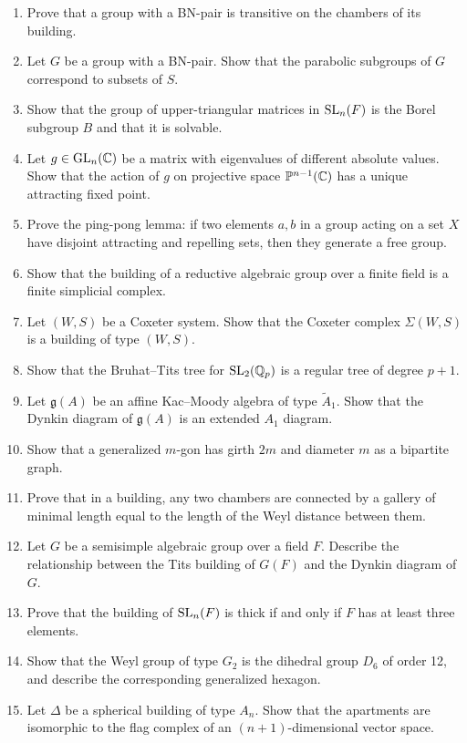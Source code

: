 \begin{enumerate}
    \item [I] Prove that a group with a BN-pair is transitive on the chambers of its building.
    \item [I] Let \(G\) be a group with a BN-pair. Show that the parabolic subgroups of \(G\) correspond to subsets of \(S\).
    \item [B] Show that the group of upper-triangular matrices in \(\operatorname{SL}_n(F)\) is the Borel subgroup \(B\) and that it is solvable.
    \item [I] Let \(g \in \operatorname{GL}_n(\mathbb{C})\) be a matrix with eigenvalues of different absolute values. Show that the action of \(g\) on projective space \(\mathbb{P}^{n-1}(\mathbb{C})\) has a unique attracting fixed point.
    \item [I] Prove the ping-pong lemma: if two elements \(a, b\) in a group acting on a set \(X\) have disjoint attracting and repelling sets, then they generate a free group.
    \item [I] Show that the building of a reductive algebraic group over a finite field is a finite simplicial complex.
    \item [I] Let \((W, S)\) be a Coxeter system. Show that the Coxeter complex \(\Sigma(W, S)\) is a building of type \((W, S)\).
    \item [I] Show that the Bruhat--Tits tree for \(\operatorname{SL}_2(\mathbb{Q}_p)\) is a regular tree of degree \(p+1\).
    \item [I] Let \(\mathfrak{g}(A)\) be an affine Kac--Moody algebra of type \(\tilde{A}_1\). Show that the Dynkin diagram of \(\mathfrak{g}(A)\) is an extended \(A_1\) diagram.
    \item [B] Show that a generalized \(m\)-gon has girth \(2m\) and diameter \(m\) as a bipartite graph.
    \item [I] Prove that in a building, any two chambers are connected by a gallery of minimal length equal to the length of the Weyl distance between them.
    \item [I] Let \(G\) be a semisimple algebraic group over a field \(F\). Describe the relationship between the Tits building of \(G(F)\) and the Dynkin diagram of \(G\).
    \item [B] Prove that the building of \(\operatorname{SL}_n(F)\) is thick if and only if \(F\) has at least three elements.
    \item [I] Show that the Weyl group of type \(G_2\) is the dihedral group \(D_6\) of order 12, and describe the corresponding generalized hexagon.
    \item [I] Let \(\Delta\) be a spherical building of type \(A_n\). Show that the apartments are isomorphic to the flag complex of an \((n+1)\)-dimensional vector space.
\end{enumerate}

